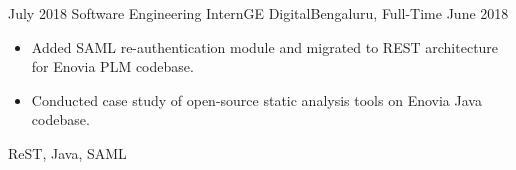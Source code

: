 \begin{experiences}
  \experience
    {July 2018} {Software Engineering Intern}{GE Digital}{Bengaluru, Full-Time}
    {June 2018}    {
                      \begin{itemize}
                        \item Added SAML re-authentication module and migrated to REST architecture for Enovia PLM codebase.
                        \item Conducted case study of open-source static analysis tools on Enovia Java codebase.
                      \end{itemize}
                    }
                    {ReST, Java, SAML}
  \emptySeparator
  
\end{experiences}
